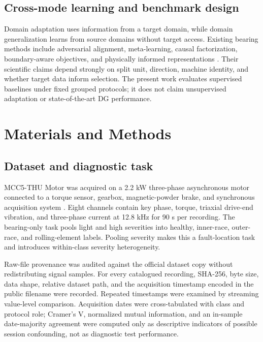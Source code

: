 \documentclass[machines,article,submit,oneauthor]{Definitions/mdpi}
\begin{document}
\subsection{Cross-mode learning and benchmark design}
Domain adaptation uses information from a target domain, while domain generalization learns from source domains without target access. Existing bearing methods include adversarial alignment, meta-learning, causal factorization, boundary-aware objectives, and physically informed representations \cite{Wan2022MultiAdversarialDA,Zhao2021JDAN,Li2021MetaLearningFewShot,Jia2023CausalFactorization,Li2022BoundaryDG,Pang2024FaultVibrationDG,Kim2023SingleDomainPI,Xie2024DualInvariantDG,Cheng2024CausalDG}. Their scientific claims depend strongly on split unit, direction, machine identity, and whether target data inform selection. The present work evaluates supervised baselines under fixed grouped protocols; it does not claim unsupervised adaptation or state-of-the-art DG performance.

\section{Materials and Methods}
\subsection{Dataset and diagnostic task}
MCC5-THU Motor was acquired on a 2.2 kW three-phase asynchronous motor connected to a torque sensor, gearbox, magnetic-powder brake, and synchronous acquisition system \cite{Chen2026MCC5DataBrief}. Eight channels contain key phase, torque, triaxial drive-end vibration, and three-phase current at 12.8 kHz for 90 s per recording. The bearing-only task pools light and high severities into healthy, inner-race, outer-race, and rolling-element labels. Pooling severity makes this a fault-location task and introduces within-class severity heterogeneity.

Raw-file provenance was audited against the official dataset copy without redistributing signal samples. For every catalogued recording, SHA-256, byte size, data shape, relative dataset path, and the acquisition timestamp encoded in the public filename were recorded. Repeated timestamps were examined by streaming value-level comparison. Acquisition dates were cross-tabulated with class and protocol role; Cramer's V, normalized mutual information, and an in-sample date-majority agreement were computed only as descriptive indicators of possible session confounding, not as diagnostic test performance.
\end{document}
